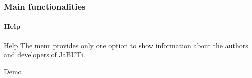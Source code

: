 \begin{frame}[parent={cmap:jabuti-gui},hasnext=false,hasprev=true]
\frametitle{Main functionalities}
\framesubtitle{Help}
\label{concept:help-menu}
\label{concept:about}

\begin{block}{Help}
The  menu provides only one option to show information about
the authors and developers of JaBUTi.
\end{block}

\begin{block}{Demo}
\end{block}
\end{frame}
